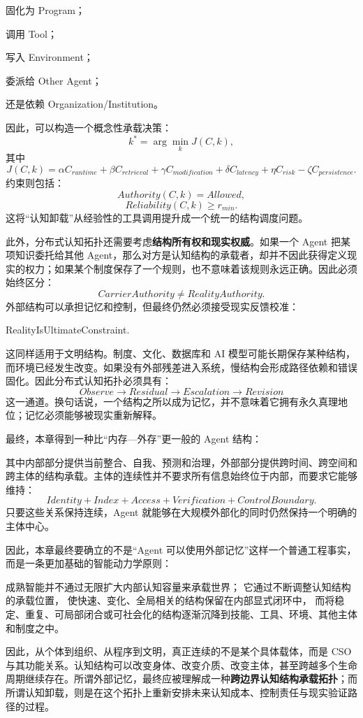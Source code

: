 固化为 Program；

调用 Tool；

写入 Environment；

委派给 Other Agent；

还是依赖 Organization/Institution。

因此，可以构造一个概念性承载决策：
\[
k^*
=
\arg\min_k
J(C,k),
\]
其中
\[
J(C,k)
=
\alpha C_{runtime}
+
\beta C_{retrieval}
+
\gamma C_{modification}
+
\delta C_{latency}
+
\eta C_{risk}
-
\zeta C_{persistence}.
\]
约束则包括：
\[
Authority(C,k)=Allowed,
\]
\[
Reliability(C,k)\geq r_{min}.
\]
这将``认知卸载''从经验性的工具调用提升成一个统一的结构调度问题。

此外，分布式认知拓扑还需要考虑\textbf{结构所有权和现实权威}。如果一个 Agent 把某项知识委托给其他 Agent，那么对方是认知结构的承载者，却并不因此获得定义现实的权力；如果某个制度保存了一个规则，也不意味着该规则永远正确。因此必须始终区分：
\[
CarrierAuthority
\neq
RealityAuthority.
\]
外部结构可以承担记忆和控制，但最终仍然必须接受现实反馈校准：
\begin{statementbox}
RealityIsUltimateConstraint.
\end{statementbox}

这同样适用于文明结构。制度、文化、数据库和 AI 模型可能长期保存某种结构，而环境已经发生改变。如果没有外部残差进入系统，慢结构会形成路径依赖和错误固化。因此分布式认知拓扑必须具有：
\[
Observe
\rightarrow
Residual
\rightarrow
Escalation
\rightarrow
Revision
\]
这一通道。换句话说，一个结构之所以成为记忆，并不意味着它拥有永久真理地位；记忆必须能够被现实重新解释。

最终，本章得到一种比``内存—外存''更一般的 Agent 结构：
\begin{statementbox}
\centering
{}
\end{statementbox}
其中内部部分提供当前整合、自我、预测和治理，外部部分提供跨时间、跨空间和跨主体的结构承载。主体的连续性并不要求所有信息始终位于内部，而要求它能够维持：
\[
Identity
+
Index
+
Access
+
Verification
+
ControlBoundary.
\]
只要这些关系保持连续，Agent 就能够在大规模外部化的同时仍然保持一个明确的主体中心。

因此，本章最终要确立的不是``Agent 可以使用外部记忆''这样一个普通工程事实，而是一条更加基础的智能动力学原则：

\begin{proposition*}
成熟智能并不通过无限扩大内部认知容量来承载世界；
它通过不断调整认知结构的承载位置，
使快速、变化、全局相关的结构保留在内部显式闭环中，
而将稳定、重复、可局部闭合或可社会化的结构逐渐沉降到技能、工具、环境、其他主体和制度之中。
\end{proposition*}

因此，从个体到组织、从程序到文明，真正连续的不是某个具体载体，而是 CSO 与其功能关系。认知结构可以改变身体、改变介质、改变主体，甚至跨越多个生命周期继续存在。所谓外部记忆，最终应被理解成一种\textbf{跨边界认知结构承载拓扑}；而所谓认知卸载，则是在这个拓扑上重新安排未来认知成本、控制责任与现实验证路径的过程。
